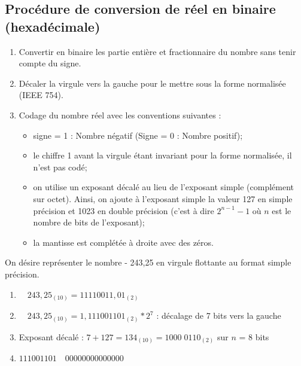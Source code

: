\documentclass[10pt,fleqn]{article} %
\begin{document}
\subsection{Procédure de conversion de réel en binaire (hexadécimale) }

\begin{methode}
\begin{enumerate}
\item Convertir en binaire les partie entière et fractionnaire du nombre sans tenir compte du signe.
\item Décaler la virgule vers la gauche pour le mettre sous la forme normalisée (IEEE 754).
\item Codage du nombre réel avec les conventions suivantes : 
\begin{itemize}
\item signe = 1 : Nombre négatif 	(Signe = 0 : Nombre positif);
\item le chiffre 1 avant la virgule étant invariant pour la forme normalisée, il n’est pas codé;
\item on utilise un exposant décalé au lieu de l’exposant simple (complément sur octet). Ainsi, on ajoute à l’exposant simple la valeur 127 en simple précision et 1023 en double précision (c’est à dire $2^{n-1}-1$ où $n$ est le nombre de bits de l’exposant);
\item la mantisse est complétée à droite avec des zéros.
\end{itemize}
\end{enumerate}
\end{methode}


\begin{exemple}
On désire représenter le nombre - 243,25 en virgule flottante au format simple précision.

\begin{enumerate}
\item $\quad 243,25_{(10)} =  11110011,01_{(2)}$
\item $\quad 243,25_{(10)} =  1,111001101_{(2)} *  2^7$ : décalage de 7 bits vers la gauche
\item Exposant décalé : $7 + 127 = 134_{(10)} = 1000\; 0110_{(2)}$ 	sur $n$ = 8 bits
\item $111001101\quad 00000000000000$
\end{enumerate}
\end{exemple}

\end{document}
